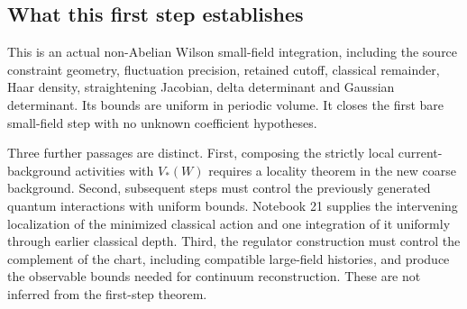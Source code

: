 \subsection{What this first step establishes}

This is an actual non-Abelian Wilson small-field integration,
including the source constraint geometry, fluctuation
precision, retained cutoff, classical remainder, Haar density,
straightening Jacobian, delta determinant and Gaussian
determinant. Its bounds are uniform in periodic volume.
It closes the first bare small-field step with no unknown
coefficient hypotheses.

Three further passages are distinct. First, composing the
strictly local current-background activities with $V_*(W)$
requires a locality theorem in the new coarse background.
Second, subsequent steps must control the previously generated
quantum interactions with uniform bounds. Notebook 21 supplies
the intervening localization of the minimized classical action
and one integration of it uniformly through earlier classical
depth. Third, the regulator construction must
control the complement of the chart, including compatible
large-field histories, and produce the observable bounds
needed for continuum reconstruction. These are not inferred
from the first-step theorem.
